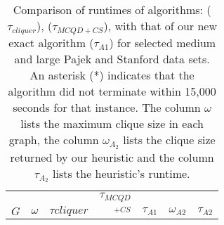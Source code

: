 \begin{table}[tbh]
\centering
\caption{Comparison of runtimes of algorithms: \cite{ostergard} ({\it $\tau_{cliquer}$}), \cite{konc2007improved} ({\it $\tau_{MCQD+CS}$}), 
with that of our new exact algorithm ($\tau_{A1}$) for selected medium and large Pajek and Stanford data sets. 
An asterisk (*) indicates that the algorithm did not terminate within 
15,000 seconds for that instance. The column $\omega$ lists the maximum clique size in each graph, 
the column $\omega_{A_2}$ lists the clique size returned by our heuristic and the column
$\tau_{A_2}$ lists the heuristic's runtime.}
\label{tab:pajek_stanford}
\begin{tabular}{lr|rrr|rr}
\toprule\toprule
	&		&			&	$\tau_{MCQD}$	&		&		&		\\
$G$	&	$\omega$	&	$\tau{cliquer}$	&	$_{+CS}$	&	$\tau_{A1}$	&	$\omega_{A2}$	&	$\tau_{A2}$	\\ \hline \hline

\end{tabular}
\end{table}
